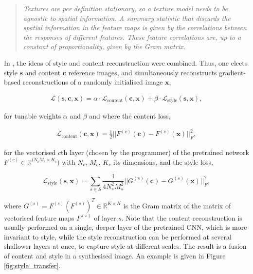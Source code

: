 \begin{quotation}
\emph{Textures are per definition stationary, so a texture model needs to be agnostic to spatial information. A summary statistic that discards the spatial information in the feature maps is given by the correlations between the responses of different features. These feature correlations are, up to a constant of proportionality, given by the Gram matrix.}
\end{quotation}

In \cite{gatys2016image}, the ideas of style and content reconstruction were combined. Thus, one elects style $\mathbf{s}$ and content $\mathbf{c}$ reference images, and simultaneously reconstructs gradient-based reconstructions of a randomly initialised image $\mathbf{x}$,

\begin{align}
\mathcal{L}(\mathbf{s}, \mathbf{c}, \mathbf{x}) = \alpha\cdot\mathcal{L}_{\text{content}}(\mathbf{c}, \mathbf{x}) + \beta\cdot\mathcal{L}_{\text{style}}(\mathbf{s},\mathbf{x}),
\end{align}

for tunable weights $\alpha$ and $\beta$ and where the content loss,

\begin{align}
\mathcal{L}_{\text{content}}(\mathbf{c}, \mathbf{x}) = \frac{1}{2}||F^{(c)}(\mathbf{c}) - F^{(c)}(\mathbf{x})||_F^2,
\end{align}

for the vectorised $c$th layer (chosen by the programmer) of the pretrained network $F^{(c)} \in \mathbb{R}^{(N_cM_c \times K_c})$ with $N_c$, $M_c$, $K_c$ its dimensions, and the style loss,

\begin{equation}
\mathcal{L}_{\text{style}}(\mathbf{s}, \mathbf{x}) = \sum_{s \in S}\frac{1}{4N_s^2M_s^2}||G^{(s)}(\mathbf{c}) - G^{(s)}(\mathbf{x})||_F^2,
\label{eq:style_loss}
\end{equation}

where $G^{(s)} = F^{(s)}(F^{(s)})^T \in \mathbb{R}^{K \times K}$ is the Gram matrix of the matrix of vectorised feature maps $F^{(s)}$ of layer $s$. Note that the content reconstruction is usually performed on a single, deeper layer of the pretrained CNN, which is more invariant to style, while the style reconstruction can be performed at several shallower layers at once, to capture style at different scales. The result is a fusion of content and style in a synthesised image. An example is given in Figure \ref{fig:style_transfer}.

